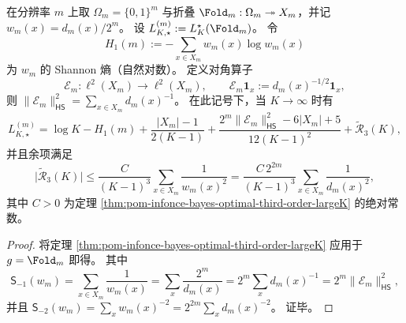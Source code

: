 \begin{corollary}\label{cor:pom-infonce-fold-third-order-largeK}
在分辨率 \(m\) 上取 \(\Omega_m=\{0,1\}^m\) 与折叠 \(\Fold_m:\Omega_m\twoheadrightarrow X_m\)，并记
\(
w_m(x)=d_m(x)/2^m
\)。
设 \(L_{K,\star}^{(m)}:=L_K^\star(\Fold_m)\)。
令
\[
H_1(m):=-\sum_{x\in X_m}w_m(x)\log w_m(x)
\]
为 \(w_m\) 的 Shannon 熵（自然对数）。
定义对角算子
\[
\mathcal E_m:\ell^2(X_m)\to\ell^2(X_m),\qquad
\mathcal E_m\mathbf 1_x:=d_m(x)^{-1/2}\mathbf 1_x,
\]
则 \(\|\mathcal E_m\|_{\mathsf{HS}}^2=\sum_{x\in X_m}d_m(x)^{-1}\)。
在此记号下，当 \(K\to\infty\) 时有
\[
L_{K,\star}^{(m)}
=\log K-H_1(m)
+\frac{|X_m|-1}{2(K-1)}
+\frac{2^m\|\mathcal E_m\|_{\mathsf{HS}}^2-6|X_m|+5}{12(K-1)^2}
+\widetilde{\mathcal R}_3(K),
\]
并且余项满足
\[
\bigl|\widetilde{\mathcal R}_3(K)\bigr|
\le
\frac{C}{(K-1)^3}\sum_{x\in X_m}\frac{1}{w_m(x)^2}
=\frac{C\,2^{2m}}{(K-1)^3}\sum_{x\in X_m}\frac{1}{d_m(x)^2},
\]
其中 \(C>0\) 为定理 \ref{thm:pom-infonce-bayes-optimal-third-order-largeK} 的绝对常数。
\end{corollary}
\begin{proof}
将定理 \ref{thm:pom-infonce-bayes-optimal-third-order-largeK} 应用于 \(g=\Fold_m\) 即得。
其中
\[
\mathsf S_{-1}(w_m)=\sum_{x\in X_m}\frac{1}{w_m(x)}
=\sum_x \frac{2^m}{d_m(x)}
=2^m\sum_x d_m(x)^{-1}
=2^m\|\mathcal E_m\|_{\mathsf{HS}}^2,
\]
并且
\(
\mathsf S_{-2}(w_m)=\sum_x w_m(x)^{-2}=2^{2m}\sum_x d_m(x)^{-2}
\)。
证毕。
\end{proof}

